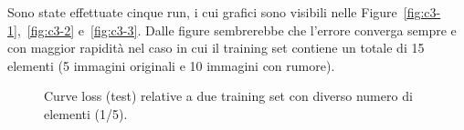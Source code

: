 \documentclass[a4paper,12pt]{article}
\begin{document}
Sono state effettuate cinque run, i cui grafici sono visibili nelle Figure~\vref{fig:c3-1},~\vref{fig:c3-2} e~\vref{fig:c3-3}. Dalle figure sembrerebbe che l'errore converga sempre e con maggior rapidità nel caso in cui il training set contiene un totale di 15 elementi (5 immagini originali e 10 immagini con rumore).

\begin{figure}[htb]
    \centering
    \caption{Curve loss (test) relative a due training set con diverso numero di elementi (1/5).}
    \label{fig:c3-1}
\end{figure}
\end{document}
